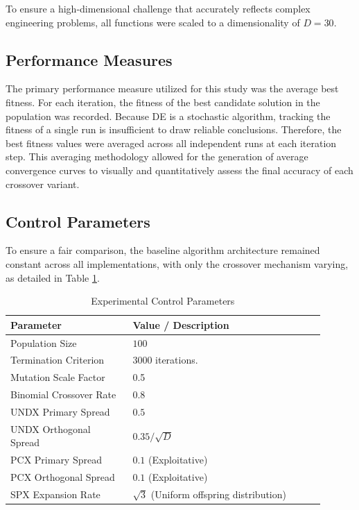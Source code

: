 \documentclass[conference]{IEEEtran}
\begin{document}
To ensure a high-dimensional challenge that accurately reflects complex engineering problems, all functions were scaled to a 
dimensionality of $D = 30$.

\subsection{Performance Measures}
The primary performance measure utilized for this study was the average best fitness. 
For each iteration, the fitness of the best candidate solution in the population was recorded. Because DE 
is a stochastic algorithm, tracking the fitness of a single run is insufficient to draw reliable conclusions. Therefore, the 
best fitness values were averaged across all independent runs at each iteration step. This averaging methodology allowed for the generation of average 
convergence curves to visually and quantitatively assess the final accuracy of each crossover variant.

\subsection{Control Parameters}
To ensure a fair comparison, the baseline algorithm architecture remained constant across all implementations, with only the 
crossover mechanism varying, as detailed in Table \ref{tab:control_params}.

\begin{table}[htbp]
    \caption{Experimental Control Parameters}
    \label{tab:control_params}
    \centering
    \begin{tabular}{p{0.35\linewidth} p{0.55\linewidth}}
        \toprule
        \textbf{Parameter} & \textbf{Value / Description} \\
        \midrule
        Population Size & $100$ \\
        Termination Criterion & $3000$ iterations. \\
        Mutation Scale Factor  & 0.5 \\
        Binomial Crossover Rate  & 0.8 \\
        \midrule
        UNDX Primary Spread  & $0.5$ \\
        UNDX Orthogonal Spread  & $0.35 / \sqrt{D}$ \\
        PCX Primary Spread  & $0.1$ (Exploitative)  \\
        PCX Orthogonal Spread  & $0.1$ (Exploitative) \\
        SPX Expansion Rate  & $\sqrt{3}$ (Uniform offspring distribution) \\
        \bottomrule
    \end{tabular}
\end{table}
\end{document}
